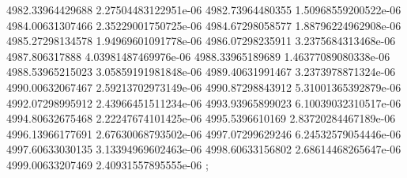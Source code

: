 {4982.33964429688 2.27504483122951e-06
4982.73964480355 1.50968559200522e-06
4984.00631307466 2.35229001750725e-06
4984.67298058577 1.88796224962908e-06
4985.27298134578 1.94969601091778e-06
4986.07298235911 3.2375684313468e-06
4987.806317888 4.03981487469976e-06
4988.33965189689 1.46377089080338e-06
4988.53965215023 3.05859191981848e-06
4989.40631991467 3.2373978871324e-06
4990.00632067467 2.59213702973149e-06
4990.87298843912 5.31001365392879e-06
4992.07298995912 2.43966451511234e-06
4993.93965899023 6.10039032310517e-06
4994.80632675468 2.22247674101425e-06
4995.5396610169 2.83720284467189e-06
4996.13966177691 2.67630068793502e-06
4997.07299629246 6.24532579054446e-06
4997.60633030135 3.13394969602463e-06
4998.60633156802 2.68614468265647e-06
4999.00633207469 2.40931557895555e-06
};